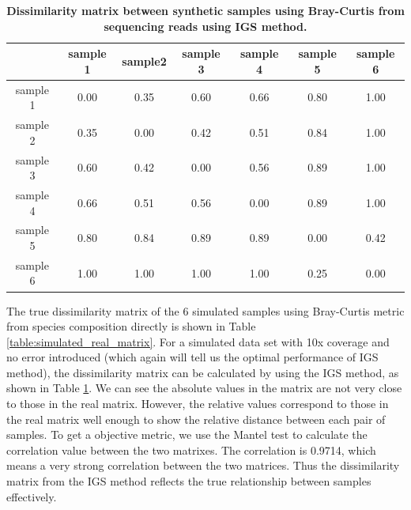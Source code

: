 \begin{table}[!ht]
\centering
\begin{tabular}{|c|c|c|c|c|c|c|}
\hline
                  & sample 1 & sample2 & sample 3 & sample 4 & sample 5 & sample 6 \\ \hline
sample 1 & 0.00              & 0.35             & 0.60              & 0.66              & 0.80              & 1.00              \\ 
sample 2 & 0.35              & 0.00             & 0.42              & 0.51              & 0.84              & 1.00              \\ 
sample 3 & 0.60              & 0.42             & 0.00              & 0.56              & 0.89              & 1.00              \\ 
sample 4 & 0.66              & 0.51             & 0.56              & 0.00              & 0.89              & 1.00              \\ 
sample 5 & 0.80              & 0.84             & 0.89              & 0.89              & 0.00              & 0.42              \\ 
sample 6 & 1.00              & 1.00             & 1.00              & 1.00              & 0.25              & 0.00              \\ \hline
\end{tabular}
\caption{\bf Dissimilarity matrix between synthetic samples using Bray-Curtis
from sequencing reads using IGS method. }
\label{table:simulated_matrix1}
\end{table}


The true dissimilarity matrix of the 6 simulated samples using Bray-Curtis 
metric from species composition directly is shown in Table \ref{table:simulated_real_matrix}.
For a simulated data set with 10x coverage and no error introduced 
(which again will tell us the optimal performance of IGS method), the dissimilarity 
matrix can be calculated by using the IGS method, as shown in Table 
\ref{table:simulated_matrix1}. We can see the absolute values in the matrix 
are not very close to those in the real matrix. However, the relative values 
correspond to those in the real matrix well enough to show the relative distance 
between each pair of samples. To get a objective metric, we use the
Mantel \cite{Mantel1967} test to calculate the correlation value between the two 
matrixes.
The correlation is 0.9714, which means a very strong correlation 
between the two matrices. Thus the dissimilarity matrix from the IGS method 
reflects the true relationship between samples effectively.

